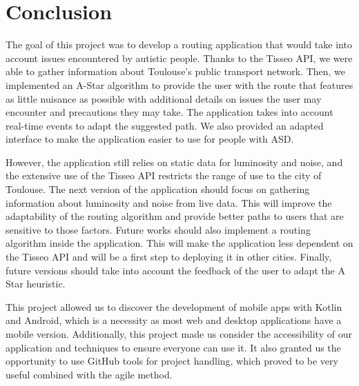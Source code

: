 \section{Conclusion}


The goal of this project was to develop a routing application that would take into account issues encountered by autistic people. Thanks to the Tisseo API, we were able to gather information about Toulouse's public transport network. Then, we implemented an A-Star algorithm to provide the user with the route that features as little nuisance as possible with additional details on issues the user may encounter and precautions they may take. The application takes into account real-time events to adapt the suggested path. We also provided an adapted interface to make the application easier to use for people with ASD.


However, the application still relies on static data for luminosity and noise, and the extensive use of the Tisseo API restricts the range of use to the city of Toulouse. The next version of the application should focus on gathering information about luminosity and noise from live data. This will improve the adaptability of the routing algorithm and provide better paths to users that are sensitive to those factors. Future works should also implement a routing algorithm inside the application. This will make the application less dependent on the Tisseo API and will be a first step to deploying it in other cities. Finally, future versions should take into account the feedback of the user to adapt the A Star heuristic.


This project allowed us to discover the development of mobile apps with Kotlin and Android, which is a necessity as most web and desktop applications have a mobile version. Additionally, this project made us consider the accessibility of our application and techniques to ensure everyone can use it. It also granted us the opportunity to use GitHub tools for project handling, which proved to be very useful combined with the agile method.
